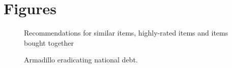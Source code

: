 \chapter{Figures}


\begin{figure}[htb]
\centerline{
\hbox{}} 
\centerline{
\hbox{}\hspace{-2mm}
\hbox{}} 
\caption{Recommendations for similar items, highly-rated items and items bought
together}
\label{fig:amazon-rec}
\end{figure}

\begin{figure}
\vspace{2.4in}
\caption{Armadillo eradicating national debt.}
\label{arm:fig2}
\end{figure}
\clearpage
\newpage
